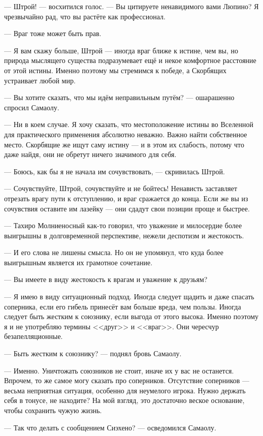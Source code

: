 --- Штрой! --- восхитился голос.
--- Вы цитируете ненавидимого вами Люпино?
Я чрезвычайно рад, что вы растёте как профессионал.

--- Враг тоже может быть прав.

--- Я вам скажу больше, Штрой --- иногда враг ближе к истине, чем вы, но природа мыслящего существа подразумевает ещё и некое комфортное расстояние от этой истины.
Именно поэтому мы стремимся к победе, а Скорбящих устраивает любой мир.

--- Вы хотите сказать, что мы идём неправильным путём? --- ошарашенно спросил Самаолу.

--- Ни в коем случае.
Я хочу сказать, что местоположение истины во Вселенной для практического применения абсолютно неважно.
Важно найти собственное место.
Скорбящие же ищут саму истину --- и в этом их слабость, потому что даже найдя, они не обретут ничего значимого для себя.

--- Боюсь, как бы я не начала им сочувствовать, --- скривилась Штрой.

--- Сочувствуйте, Штрой, сочувствуйте и не бойтесь!
Ненависть заставляет отрезать врагу пути к отступлению, и враг сражается до конца.
Если же вы из сочувствия оставите им лазейку --- они сдадут свои позиции проще и быстрее.

--- Тахиро Молниеносный как-то говорил, что уважение и милосердие более выигрышны в долговременной перспективе, нежели деспотизм и жестокость.

--- И его слова не лишены смысла.
Но он не упомянул, что куда более выигрышным является их грамотное сочетание.

--- Вы имеете в виду жестокость к врагам и уважение к друзьям?

--- Я имею в виду ситуационный подход.
Иногда следует щадить и даже спасать соперника, если его гибель принесёт вам больше вреда, чем пользы.
Иногда следует быть жестким к союзнику, если выгода от этого высока.
Именно поэтому я и не употребляю термины <<друг>> и <<враг>>.
Они чересчур безапелляционные.

--- Быть жестким к союзнику? --- поднял бровь Самаолу.

--- Именно.
Уничтожать союзников не стоит, иначе их у вас не останется.
Впрочем, то же самое могу сказать про соперников.
Отсутствие соперников --- весьма неприятная ситуация, особенно для неумелого игрока.
Нужно держать себя в тонусе, не находите?
На мой взгляд, это достаточно веское основание, чтобы сохранить чужую жизнь.

--- Так что делать с сообщением Сиэхено? --- осведомился Самаолу.

